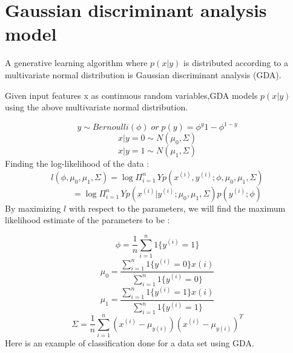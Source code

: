 \documentclass[a4paper,12pt,reqno]{amsart}
\begin{document}

\section{Gaussian discriminant analysis model}


A generative learning algorithm where $p(x|y)$ is distributed according to a multivariate normal distribution is Gaussian discriminant analysis (GDA).

Given input features x as continuous random variables,GDA models $p(x|y)$ using the above multivariate normal distribution.

$$ y \sim Bernoulli(\phi) \; or \; p(y) = {\phi}^y{1-\phi}^{1-y}$$
$$x|y = 0 \sim N({\mu}_0,\Sigma)$$
$$x|y = 1 \sim N({\mu}_1,\Sigma)$$
Finding the log-likelihood of the data :
$$ 
l(\phi, \mu_0, \mu_1, \Sigma) = \log {\Pi_{i=1}^n} \, Y p(x^{(i)}, y^{(i)}; \phi, \mu_0, \mu_1, \Sigma)
$$
$$
\qquad \; = \log {\Pi_{i=1}^n} \, Y p(x^{(i)}|y^{(i)}; \mu_0, \mu_1, \Sigma)p(y^{(i)}; \phi)
$$\newline
By maximizing $l$ with respect to the parameters, we will find the maximum likelihood estimate of the parameters to be :

\begin{equation} \label{eq10}
\phi = \frac{1}{n} \sum_{i=1}^{n} 1\{{y^{(i)}=1}\}
\end{equation} 
\begin{equation} \label{eq11}
\mu_0 = \frac{\sum_{i=1}^{n} 1\{y^{(i)}=0\}x(i)}{\sum_{i=1}^{n} 1\{y^{(i)}=0\}}
\end{equation} 
\begin{equation} \label{eq12}
\mu_1 = \frac{\sum_{i=1}^{n} 1\{y^{(i)}=1\}x(i)}{\sum_{i=1}^{n} 1\{y^{(i)}=1\}}
\end{equation} 
\begin{equation} \label{eq13}
\Sigma = \frac{1}{n} \sum_{i=1}^{n} (x^{(i)} - \mu_{y(i)}) (x^{(i)} - \mu_{y(i)})^T
\end{equation} 
Here is an example of classification done for a data set using GDA.

\begin{center}
\end{center}
\end{document}
